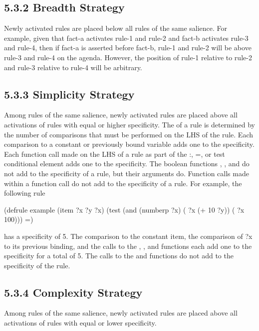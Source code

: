 \documentclass[letterpaper,10pt,english]{sphinxmanual}
\begin{document}
\subsection{5.3.2 Breadth Strategy}
\label{\detokenize{defrule:breadth-strategy}}
Newly activated rules are placed below all rules of the same salience.
For example, given that fact-a activates rule-1 and rule-2 and fact-b
activates rule-3 and rule-4, then if fact-a is asserted before fact-b,
rule-1 and rule-2 will be above rule-3 and rule-4 on the agenda.
However, the position of rule-1 relative to rule-2 and rule-3 relative
to rule-4 will be arbitrary.


\subsection{5.3.3 Simplicity Strategy}
\label{\detokenize{defrule:simplicity-strategy}}
Among rules of the same salience, newly activated rules are placed above
all activations of rules with equal or higher specificity. The
 of a rule is determined by the number of comparisons
that must be performed on the LHS of the rule. Each comparison to a
constant or previously bound variable adds one to the specificity. Each
function call made on the LHS of a rule as part of the :, =, or test
conditional element adds one to the specificity. The boolean functions
, , and  do not add to the specificity of a rule,
but their arguments do. Function calls made within a function call do
not add to the specificity of a rule. For example, the following rule

\begin{sphinxVerbatim}[commandchars=\\\{\}]
(defrule example
  (item ?x ?y ?x)
  (test (and (numberp ?x) (\PYGZgt{} ?x (+ 10 ?y)) (\PYGZlt{} ?x 100)))
 =\PYGZgt{})
\end{sphinxVerbatim}

has a specificity of 5. The comparison to the constant item, the
comparison of ?x to its previous binding, and the calls to the
, \sphinxstylestrong{\textless{}}, and \sphinxstylestrong{\textgreater{}} functions each add one to the specificity
for a total of 5. The calls to the  and \sphinxstylestrong{+} functions do not
add to the specificity of the rule.


\subsection{5.3.4 Complexity Strategy}
\label{\detokenize{defrule:complexity-strategy}}
Among rules of the same salience, newly activated rules are placed above
all activations of rules with equal or lower specificity.
\end{document}
